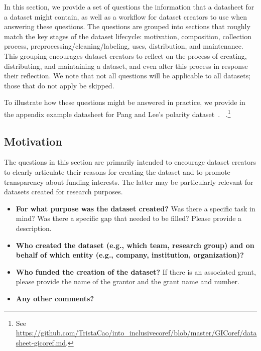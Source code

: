 In this section, we provide a set of questions  the
information that a datasheet for a dataset might contain, as well as a
workflow for dataset creators to use when answering these
questions. The questions are grouped into sections that roughly match
the key stages of the dataset lifecycle: motivation, composition,
collection process, preprocessing/cleaning/labeling, uses,
distribution, and maintenance. This grouping encourages dataset
creators to reflect on the process of creating, distributing, and
maintaining a dataset, and even alter this process in response 
their reflection.  We note that not all questions will be applicable
to all datasets; those that do not apply  be skipped.

To illustrate how these questions might be answered in practice, we
provide in the appendix  example datasheet for Pang and Lee's
polarity dataset~\cite{polarity}. ~\cite{cao2019toward}.\footnote{See \url{https://github.com/TristaCao/into_inclusivecoref/blob/master/GICoref/datasheet-gicoref.md}.} 

\subsection{Motivation}

The questions in this section are primarily intended to encourage
dataset creators to clearly articulate their reasons for creating the
dataset and to promote transparency about funding interests.
The latter may be particularly relevant for datasets created for
research purposes.\\

\begin{itemize}

\item \textbf{For what purpose was the dataset created?} Was there a specific task in mind? Was there a specific gap that needed to be filled? Please provide a description.

\item \textbf{Who created the dataset (e.g., which team, research group) and on behalf of which entity (e.g., company, institution, organization)?}

\item \textbf{Who funded the creation of the dataset?} If there is an associated grant, please provide the name of the grantor and the grant name and number.

\item \textbf{Any other comments?}

\end{itemize}

